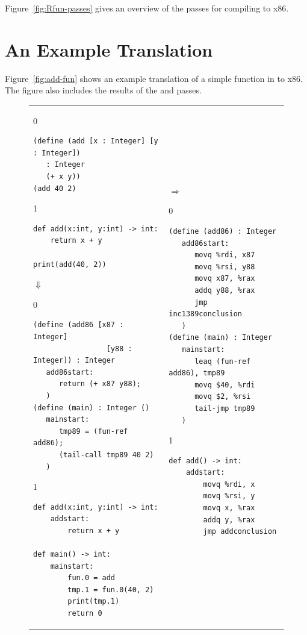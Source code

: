 \documentclass[7x10,nocrop]{TimesAPriori_MIT}%
\def\racketEd{0}
\def\pythonEd{1}
\def\edition{1}
\begin{document}
Figure~\ref{fig:Rfun-passes} gives an overview of the passes for
compiling \LangFun{} to x86.

\section{An Example Translation}
\label{sec:functions-example}

Figure~\ref{fig:add-fun} shows an example translation of a simple
function in \LangFun{} to x86. The figure also includes the results of the
 and  passes.

\begin{figure}[htbp]
\begin{tabular}{ll}
\begin{minipage}{0.4\textwidth}
{\if\edition\racketEd
\begin{lstlisting}[basicstyle=\ttfamily\footnotesize]
(define (add [x : Integer] [y : Integer])
   : Integer
   (+ x y))
(add 40 2)
\end{lstlisting}
\fi}
{\if\edition\pythonEd
\begin{lstlisting}[basicstyle=\ttfamily\footnotesize]
def add(x:int, y:int) -> int:
    return x + y

print(add(40, 2))
\end{lstlisting}
\fi}
$\Downarrow$
{\if\edition\racketEd
\begin{lstlisting}[basicstyle=\ttfamily\footnotesize]
(define (add86 [x87 : Integer]
                 [y88 : Integer]) : Integer
   add86start:
      return (+ x87 y88);
   )
(define (main) : Integer ()
   mainstart:
      tmp89 = (fun-ref add86);
      (tail-call tmp89 40 2)
   )
\end{lstlisting}
\fi}
{\if\edition\pythonEd
\begin{lstlisting}[basicstyle=\ttfamily\footnotesize]
def add(x:int, y:int) -> int:
    addstart:
        return x + y

def main() -> int:
    mainstart:
        fun.0 = add
        tmp.1 = fun.0(40, 2)
        print(tmp.1)
        return 0
\end{lstlisting}
\fi}
\end{minipage}
&
$\Rightarrow$
\begin{minipage}{0.5\textwidth}
{\if\edition\racketEd
\begin{lstlisting}[basicstyle=\ttfamily\footnotesize]
(define (add86) : Integer
   add86start:
      movq %rdi, x87
      movq %rsi, y88
      movq x87, %rax
      addq y88, %rax
      jmp inc1389conclusion
   )
(define (main) : Integer
   mainstart:
      leaq (fun-ref add86), tmp89
      movq $40, %rdi
      movq $2, %rsi
      tail-jmp tmp89
   )
\end{lstlisting}
\fi}
{\if\edition\pythonEd
\begin{lstlisting}[basicstyle=\ttfamily\footnotesize]
def add() -> int:
    addstart:
        movq %rdi, x
        movq %rsi, y
        movq x, %rax
        addq y, %rax
        jmp addconclusion


\end{lstlisting}}
\end{minipage}
\end{tabular}
\end{figure}
\end{document}
